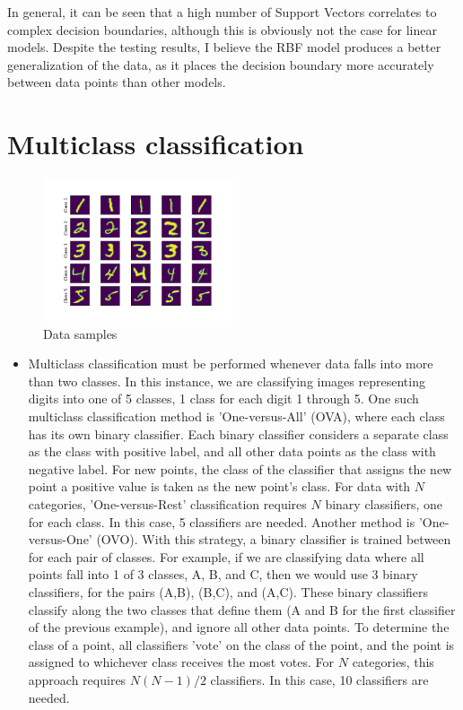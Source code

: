 \documentclass[a4paper]{article}
\begin{document}
In general, it can be seen that a high number of Support Vectors correlates to complex decision boundaries, although this is obviously not the case for linear models.  Despite the testing results, I believe the RBF model produces a better generalization of the data, as it places the decision boundary more accurately between data points than other models.
\clearpage

\section{Multiclass classification}
\begin{figure}[h]
  \begin{center}
    \includegraphics[width=0.5\textwidth]{3.png}
    \caption{Data samples}
  \end{center}
\end{figure}
\begin{itemize}
  \item Multiclass classification must be performed whenever data falls into more than two classes.  In this instance, we are classifying images representing digits into one of 5 classes, 1 class for each digit 1 through 5.  One such multiclass classification method is 'One-versus-All' (OVA), where each class has its own binary classifier.  Each binary classifier considers a separate class as the class with positive label, and all other data points as the class with negative label.  For new points, the class of the classifier that assigns the new point a positive value is taken as the new point's class.  For data with $N$ categories, 'One-versus-Rest' classification requires $N$ binary classifiers, one for each class. In this case, 5 classifiers are needed.
Another method is 'One-versus-One' (OVO).  With this strategy, a binary classifier is trained between for each pair of classes.  For example, if we are classifying data where all points fall into 1 of 3 classes, A, B, and C, then we would use 3 binary classifiers, for the pairs (A,B), (B,C), and (A,C).  These binary classifiers classify along the two classes that define them (A and B for the first classifier of the previous example), and ignore all other data points.  To determine the class of a point, all classifiers 'vote' on the class of the point, and the point is assigned to whichever class receives the most votes.  For $N$ categories, this approach requires $N(N-1)/2$ classifiers. In this case, 10 classifiers are needed.
\end{itemize}
\end{document}
